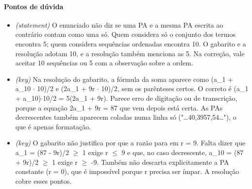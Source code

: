 \documentclass{article}%
\begin{document}
\paragraph{Pontos de dúvida}%
\begin{itemize}%
\item%
\textit{(statement)} O enunciado não diz se uma PA e a mesma PA escrita ao contrário contam como uma só. Quem considera só o conjunto dos termos encontra 5; quem considera sequências ordenadas encontra 10. O gabarito e a resolução adotam 10, e a resolução também menciona as 5. Na correção, vale aceitar 10 sequências ou 5 com a observação sobre a ordem.%
\item%
\textit{(key)} Na resolução do gabarito, a fórmula da soma aparece como (a\_1 + a\_10 $\cdot$ 10)/2 e (2a\_1 + 9r $\cdot$ 10)/2, sem os parênteses certos. O correto é (a\_1 + a\_10)$\cdot$10/2 = 5(2a\_1 + 9r). Parece erro de digitação ou de transcrição, porque a equação 2a\_1 + 9r = 87 que vem depois está certa. As PAs decrescentes também aparecem coladas numa linha só ("\ldots{}40,3957,54\ldots{}"), o que é apenas formatação.%
\item%
\textit{(key)} O gabarito não justifica por que a razão para em r = 9. Falta dizer que a\_1 = (87 - 9r)/2 $\geq$ 1 exige r $\leq$ 9 e que, no caso decrescente, a\_10 = (87 + 9r)/2 $\geq$ 1 exige r $\geq$ -9. Também não descarta explicitamente a PA constante (r = 0), que é impossível porque r precisa ser ímpar. A resolução cobre esses pontos.%
\end{itemize}%
\end{document}
